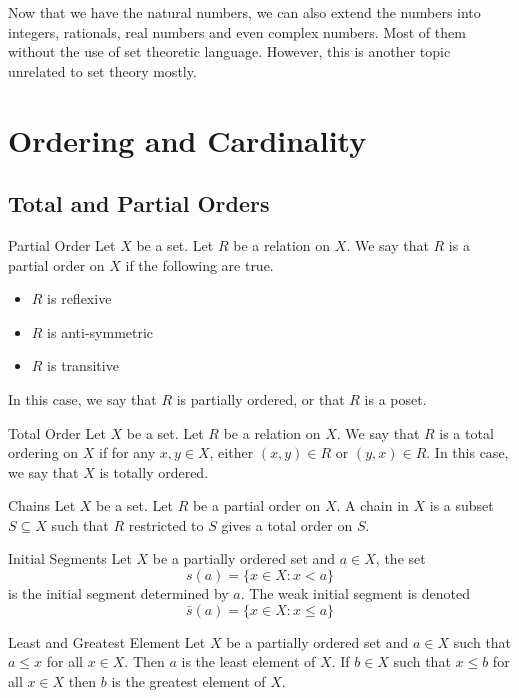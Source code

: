 \documentclass[a4paper]{article}
\begin{document}
Now that we have the natural numbers, we can also extend the numbers into integers, rationals, real numbers and even complex numbers. Most of them without the use of set theoretic language. However, this is another topic unrelated to set theory mostly. 

\pagebreak
\section{Ordering and Cardinality}
\subsection{Total and Partial Orders}
\begin{defn}{Partial Order}{} Let $X$ be a set. Let $R$ be a relation on $X$. We say that $R$ is a partial order on $X$ if the following are true. 
\begin{itemize}
\item $R$ is reflexive
\item $R$ is anti-symmetric
\item $R$ is transitive
\end{itemize}
In this case, we say that $R$ is partially ordered, or that $R$ is a poset. 
\end{defn}

\begin{defn}{Total Order}{} Let $X$ be a set. Let $R$ be a relation on $X$. We say that $R$ is a total ordering on $X$ if for any $x,y\in X$, either $(x,y)\in R$ or $(y,x)\in R$. In this case, we say that $X$ is totally ordered. 
\end{defn}

\begin{defn}{Chains}{} Let $X$ be a set. Let $R$ be a partial order on $X$. A chain in $X$ is a subset $S\subseteq X$ such that $R$ restricted to $S$ gives a total order on $S$. 
\end{defn}

\begin{defn}{Initial Segments}{} Let $X$ be a partially ordered set and $a\in X$, the set $$s(a)=\{x\in X:x<a\}$$ is the initial segment determined by $a$. The weak initial segment is denoted $$\bar{s}(a)=\{x\in X:x\leq a\}$$ 
\end{defn}

\begin{defn}{Least and Greatest Element}{} Let $X$ be a partially ordered set and $a\in X$ such that $a\leq x$ for all $x\in X$. Then $a$ is the least element of $X$. If $b\in X$ such that $x\leq b$ for all $x\in X$ then $b$ is the greatest element of $X$. 
\end{defn}
\end{document}
